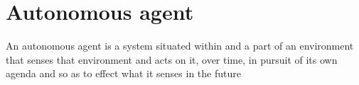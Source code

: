 \documentclass[a4paper]{article}
\title{}
\date{}
\begin{document}
    \maketitle
    
    
    \section{Autonomous agent}
        An autonomous agent is a system situated within and a part of an environment that senses that environment and acts on it, over time, in pursuit of its own agenda and so as to effect what it senses in the future
        \cite{franklin-1997-is-it-an-agent-or-just-a-program-a-taxonomy-for-autonomous-agents}
        
        
\end{document}
